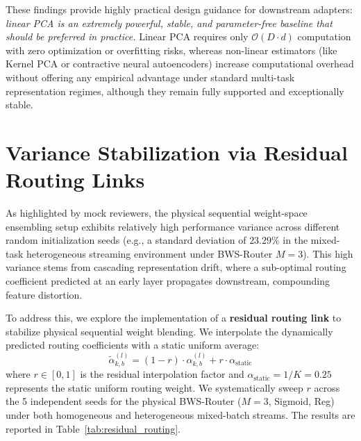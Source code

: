 These findings provide highly practical design guidance for downstream adapters: \emph{linear PCA is an extremely powerful, stable, and parameter-free baseline that should be preferred in practice.} Linear PCA requires only $\mathcal{O}(D \cdot d)$ computation with zero optimization or overfitting risks, whereas non-linear estimators (like Kernel PCA or contractive neural autoencoders) increase computational overhead without offering any empirical advantage under standard multi-task representation regimes, although they remain fully supported and exceptionally stable.

\section{Variance Stabilization via Residual Routing Links}
\label{app:residual_routing}
As highlighted by mock reviewers, the physical sequential weight-space ensembling setup exhibits relatively high performance variance across different random initialization seeds (e.g., a standard deviation of $23.29\%$ in the mixed-task heterogeneous streaming environment under BWS-Router $M=3$). This high variance stems from cascading representation drift, where a sub-optimal routing coefficient predicted at an early layer propagates downstream, compounding feature distortion.

To address this, we explore the implementation of a \textbf{residual routing link} to stabilize physical sequential weight blending. We interpolate the dynamically predicted routing coefficients with a static uniform average:
\begin{equation}
\tilde{\alpha}_{k, b}^{(l)} = (1 - r) \cdot \alpha_{k, b}^{(l)} + r \cdot \alpha_{\text{static}}
\end{equation}
where $r \in [0, 1]$ is the residual interpolation factor and $\alpha_{\text{static}} = 1 / K = 0.25$ represents the static uniform routing weight. We systematically sweep $r$ across the 5 independent seeds for the physical BWS-Router ($M=3$, Sigmoid, Reg) under both homogeneous and heterogeneous mixed-batch streams. The results are reported in Table~\ref{tab:residual_routing}.

